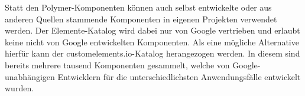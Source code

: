 Statt den Polymer-Komponenten können auch selbst entwickelte oder aus anderen Quellen stammende Komponenten in eigenen Projekten verwendet werden. Der Elemente-Katalog wird dabei nur von Google vertrieben und erlaubt keine nicht von Google entwickelten Komponenten. Als eine mögliche Alternative hierfür kann der customelements.io-Katalog \cite{citeulike:13916423} herangezogen werden. In diesem sind bereits mehrere tausend Komponenten gesammelt, welche von Google-unabhängigen Entwicklern für die unterschiedlichsten Anwendungsfälle entwickelt wurden.

